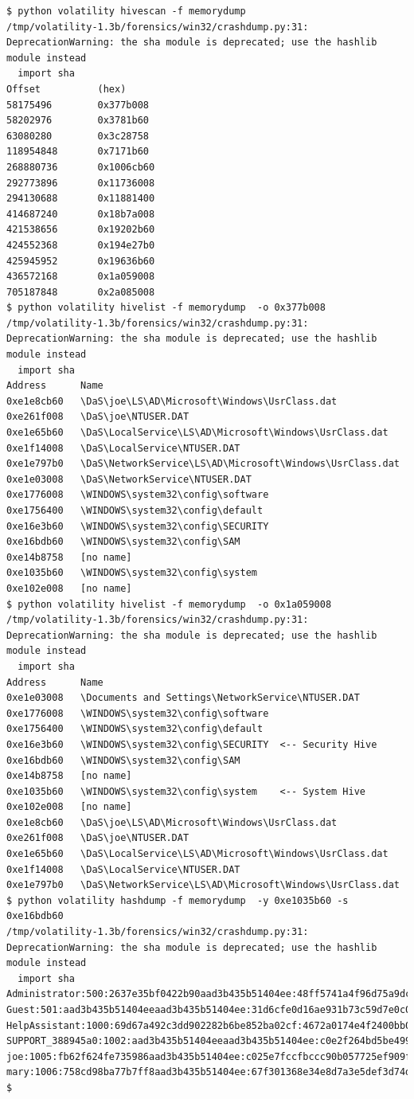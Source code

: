 \documentclass[a4paper,
    11pt,
    normalheadings,
    parindent,
    UKenglish,
    abstracton,
    ]{scrartcl}
\begin{document}
\begin{verbatim}
$ python volatility hivescan -f memorydump
/tmp/volatility-1.3b/forensics/win32/crashdump.py:31: DeprecationWarning: the sha module is deprecated; use the hashlib module instead
  import sha
Offset          (hex)
58175496        0x377b008
58202976        0x3781b60
63080280        0x3c28758
118954848       0x7171b60
268880736       0x1006cb60
292773896       0x11736008
294130688       0x11881400
414687240       0x18b7a008
421538656       0x19202b60
424552368       0x194e27b0
425945952       0x19636b60
436572168       0x1a059008
705187848       0x2a085008
$ python volatility hivelist -f memorydump  -o 0x377b008
/tmp/volatility-1.3b/forensics/win32/crashdump.py:31: DeprecationWarning: the sha module is deprecated; use the hashlib module instead
  import sha
Address      Name
0xe1e8cb60   \DaS\joe\LS\AD\Microsoft\Windows\UsrClass.dat
0xe261f008   \DaS\joe\NTUSER.DAT
0xe1e65b60   \DaS\LocalService\LS\AD\Microsoft\Windows\UsrClass.dat
0xe1f14008   \DaS\LocalService\NTUSER.DAT
0xe1e797b0   \DaS\NetworkService\LS\AD\Microsoft\Windows\UsrClass.dat
0xe1e03008   \DaS\NetworkService\NTUSER.DAT
0xe1776008   \WINDOWS\system32\config\software
0xe1756400   \WINDOWS\system32\config\default
0xe16e3b60   \WINDOWS\system32\config\SECURITY
0xe16bdb60   \WINDOWS\system32\config\SAM
0xe14b8758   [no name]
0xe1035b60   \WINDOWS\system32\config\system
0xe102e008   [no name]
$ python volatility hivelist -f memorydump  -o 0x1a059008
/tmp/volatility-1.3b/forensics/win32/crashdump.py:31: DeprecationWarning: the sha module is deprecated; use the hashlib module instead
  import sha
Address      Name
0xe1e03008   \Documents and Settings\NetworkService\NTUSER.DAT
0xe1776008   \WINDOWS\system32\config\software
0xe1756400   \WINDOWS\system32\config\default
0xe16e3b60   \WINDOWS\system32\config\SECURITY  <-- Security Hive
0xe16bdb60   \WINDOWS\system32\config\SAM
0xe14b8758   [no name]
0xe1035b60   \WINDOWS\system32\config\system    <-- System Hive
0xe102e008   [no name]
0xe1e8cb60   \DaS\joe\LS\AD\Microsoft\Windows\UsrClass.dat
0xe261f008   \DaS\joe\NTUSER.DAT
0xe1e65b60   \DaS\LocalService\LS\AD\Microsoft\Windows\UsrClass.dat
0xe1f14008   \DaS\LocalService\NTUSER.DAT
0xe1e797b0   \DaS\NetworkService\LS\AD\Microsoft\Windows\UsrClass.dat
$ python volatility hashdump -f memorydump  -y 0xe1035b60 -s 0xe16bdb60
/tmp/volatility-1.3b/forensics/win32/crashdump.py:31: DeprecationWarning: the sha module is deprecated; use the hashlib module instead
  import sha
Administrator:500:2637e35bf0422b90aad3b435b51404ee:48ff5741a4f96d75a9dc23432a6c2fb6:::
Guest:501:aad3b435b51404eeaad3b435b51404ee:31d6cfe0d16ae931b73c59d7e0c089c0:::
HelpAssistant:1000:69d67a492c3dd902282b6be852ba02cf:4672a0174e4f2400bb0fd10d50b9868c:::
SUPPORT_388945a0:1002:aad3b435b51404eeaad3b435b51404ee:c0e2f264bd5be499af3d7b9740579aa7:::
joe:1005:fb62f624fe735986aad3b435b51404ee:c025e7fccfbccc90b057725ef909f4e2:::
mary:1006:758cd98ba77b7ff8aad3b435b51404ee:67f301368e34e8d7a3e5def3d74dbbf2:::
$
\end{verbatim}
\end{document}
